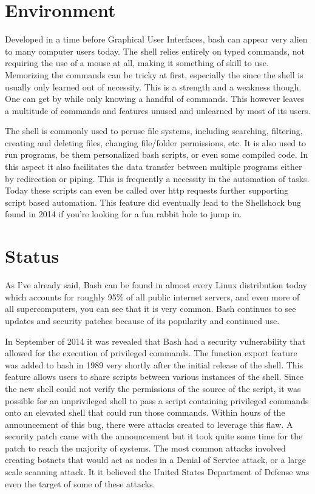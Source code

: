 \documentclass[prb,preprint]{revtex4-1}
\begin{document}
\section*{Environment}
Developed in a time before Graphical User Interfaces, bash can appear very alien to many computer users today. The shell relies entirely on typed commands, not requiring the use of a mouse at all, making it something of skill to use. Memorizing the commands can be tricky at first, especially the since the shell is usually only learned out of necessity. This is a strength and a weakness though. One can get by while only knowing a handful of commands. This however leaves a multitude of commands and features unused and unlearned by most of its users.

The shell is commonly used to peruse file systems, including searching, filtering, creating and deleting files, changing file/folder permissions, etc. It is also used to run programs, be them personalized bash scripts, or even some compiled code. In this aspect it also facilitates the data transfer between multiple programs either by redirection or piping. This is frequently a necessity in the automation of tasks. Today these scripts can even be called over http requests further supporting script based automation. This feature did eventually lead to the Shellshock bug found in 2014 if you're looking for a fun rabbit hole to jump in.

\section*{Status}
As I've already said, Bash can be found in almost every Linux distribution today which accounts for roughly 95\% of all public internet servers, and even more of all supercomputers, you can see that it is very common. Bash continues to see updates and security patches because of its popularity and continued use. 

In September of 2014 it was revealed that Bash had a security vulnerability that allowed for the execution of privileged commands. The function export feature was added to bash in 1989 very shortly after the initial release of the shell. This feature allows users to share scripts between various instances of the shell. Since the new shell could not verify the permissions of the source of the script, it was possible for an unprivileged shell to pass a script containing privileged commands onto an elevated shell that could run those commands. Within hours of the announcement of this bug, there were attacks created to leverage this flaw. A security patch came with the announcement but it took quite some time for the patch to reach the majority of systems. The most common attacks involved creating botnets that would act as nodes in a Denial of Service attack, or a large scale scanning attack. It it believed the United States Department of Defense was even the target of some of these attacks.
\end{document}
